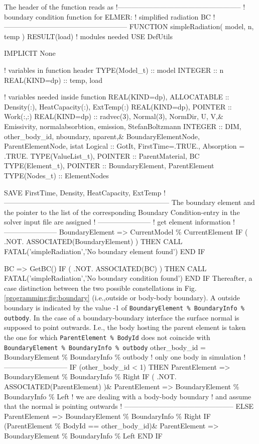 The header of the function reads as
\ttbegin
!-----------------------------------------------------
! boundary condition function for ELMER:
!  simplified radiation BC
!-----------------------------------------------------
FUNCTION simpleRadiation( model, n, temp ) RESULT(load)
  ! modules needed
  USE DefUtils

  IMPLICIT None

  ! variables in function header
  TYPE(Model\_t) :: model
  INTEGER :: n
  REAL(KIND=dp) :: temp, load

  ! variables needed inside function
  REAL(KIND=dp), ALLOCATABLE :: Density(:), HeatCapacity(:), ExtTemp(:)
  REAL(KIND=dp), POINTER :: Work(:,:)
  REAL(KIND=dp) :: radvec(3), Normal(3), NormDir, U, V,&
       Emissivity, normalabsorbtion, emission, StefanBoltzmann
  INTEGER :: DIM, other_body_id, nboundary, nparent,&
       BoundaryElementNode, ParentElementNode, istat
  Logical :: GotIt, FirstTime=.TRUE., Absorption = .TRUE.
  TYPE(ValueList\_t), POINTER :: ParentMaterial, BC
  TYPE(Element\_t), POINTER :: BoundaryElement, ParentElement
  TYPE(Nodes\_t) :: ElementNodes

  SAVE FirstTime, Density, HeatCapacity, ExtTemp
!-----------------------------------------------------------------------
\ttend
The boundary element and the pointer to the list of the corresponding Boundary Condition-entry in the solver input file are assigned
\ttbegin
! -----------------------
! get element information
! -----------------------
  BoundaryElement => CurrentModel \% CurrentElement
  IF ( .NOT. ASSOCIATED(BoundaryElement) ) THEN
     CALL FATAL('simpleRadiation','No boundary element found')
  END IF

  BC => GetBC()
  IF ( .NOT. ASSOCIATED(BC) ) THEN
     CALL FATAL('simpleRadiation','No boundary condition found')
  END IF
\ttend
Thereafter, a case distinction between the two possible constellations in Fig. \ref{programming:fig:boundary} (i.e.,outside or body-body boundary). A outside boundary is indicated by the value -1 of \texttt{BoundaryElement \% BoundaryInfo \% outbody}. In the case of a boundary-boundary interface the surface normal is supposed to point outwards. I.e., the body hosting the parent element is taken the one for which \texttt{ParentElement \% BodyId} does not coincide with \texttt{BoundaryElement \% BoundaryInfo \% outbody}
\ttbegin
  other_body_id = BoundaryElement \% BoundaryInfo \% outbody
  ! only one body in simulation
  ! ---------------------------
  IF (other_body_id < 1) THEN 
     ParentElement => BoundaryElement \% BoundaryInfo \% Right
     IF ( .NOT. ASSOCIATED(ParentElement) )&
          ParentElement => BoundaryElement \% BoundaryInfo \% Left
  ! we are dealing with a body-body boundary 
  ! and assume that the normal is pointing outwards
  ! -----------------------------------------------
  ELSE 
     ParentElement => BoundaryElement \% BoundaryInfo \% Right
     IF (ParentElement \% BodyId == other_body_id)&
          ParentElement => BoundaryElement \% BoundaryInfo \% Left
  END IF

